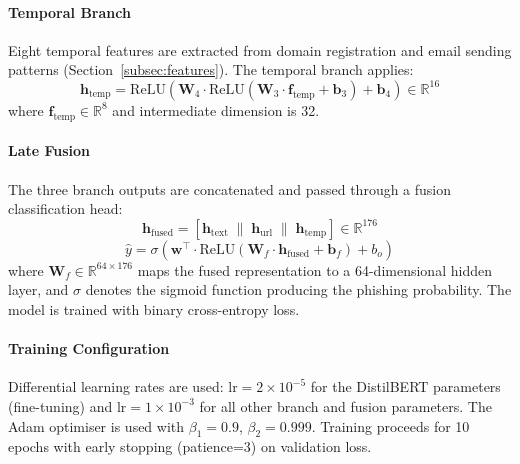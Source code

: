 \documentclass[conference]{IEEEtran}
\begin{document}
\paragraph{Temporal Branch}
Eight temporal features are extracted from domain registration and email
sending patterns (Section~\ref{subsec:features}). The temporal branch
applies:
\begin{equation}
  \mathbf{h}_{\text{temp}} = \text{ReLU}(\mathbf{W}_4 \cdot \text{ReLU}(\mathbf{W}_3 \cdot \mathbf{f}_{\text{temp}} + \mathbf{b}_3) + \mathbf{b}_4) \in \mathbb{R}^{16}
  \label{eq:temp_branch}
\end{equation}
where $\mathbf{f}_{\text{temp}} \in \mathbb{R}^{8}$ and intermediate
dimension is 32.

\paragraph{Late Fusion}
The three branch outputs are concatenated and passed through a fusion
classification head:
\begin{equation}
  \mathbf{h}_{\text{fused}} = [\mathbf{h}_{\text{text}} \;\|\; \mathbf{h}_{\text{url}} \;\|\; \mathbf{h}_{\text{temp}}] \in \mathbb{R}^{176}
  \label{eq:late_fusion}
\end{equation}
\begin{equation}
  \hat{y} = \sigma(\mathbf{w}^{\top} \cdot \text{ReLU}(\mathbf{W}_f \cdot \mathbf{h}_{\text{fused}} + \mathbf{b}_f) + b_o)
  \label{eq:decision}
\end{equation}
where $\mathbf{W}_f \in \mathbb{R}^{64 \times 176}$ maps the fused
representation to a 64-dimensional hidden layer, and $\sigma$ denotes the
sigmoid function producing the phishing probability. The model is trained
with binary cross-entropy loss.

\paragraph{Training Configuration}
Differential learning rates are used: $\text{lr}=2 \times 10^{-5}$ for the
DistilBERT parameters (fine-tuning) and $\text{lr}=1 \times 10^{-3}$ for
all other branch and fusion parameters. The Adam optimiser is used with
$\beta_1=0.9$, $\beta_2=0.999$. Training proceeds for 10 epochs with
early stopping (patience=3) on validation loss.
\end{document}
